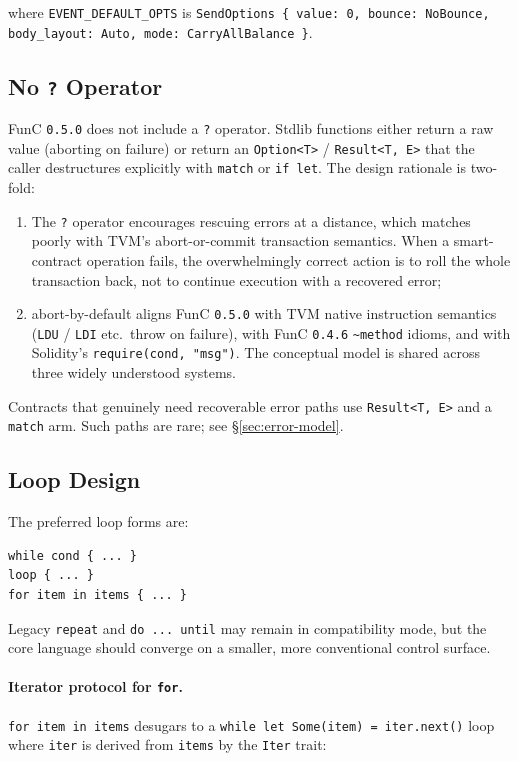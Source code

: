 \documentclass[12pt,oneside]{article}
\begin{document}
where \verb|EVENT_DEFAULT_OPTS| is \verb|SendOptions { value: 0, bounce: NoBounce, body_layout: Auto, mode: CarryAllBalance }|.

\subsection{No \texttt{?} Operator}
FunC \verb|0.5.0| does not include a \verb|?| operator. Stdlib
functions either return a raw value (aborting on failure) or return an
\verb|Option<T>| / \verb|Result<T, E>| that the caller destructures
explicitly with \verb|match| or \verb|if let|. The design rationale is
two-fold:

\begin{enumerate}
\item The \verb|?| operator encourages rescuing errors at a distance,
which matches poorly with TVM's abort-or-commit transaction
semantics. When a smart-contract operation fails, the
overwhelmingly correct action is to roll the whole transaction
back, not to continue execution with a recovered error;
\item abort-by-default aligns FunC \verb|0.5.0| with TVM native
instruction semantics (\verb|LDU| / \verb|LDI| etc.\ throw on
failure), with FunC \verb|0.4.6| \verb|~method| idioms, and with
Solidity's \verb|require(cond, "msg")|. The conceptual model is
shared across three widely understood systems.
\end{enumerate}

Contracts that genuinely need recoverable error paths use
\verb|Result<T, E>| and a \verb|match| arm. Such paths are rare; see
\S\ref{sec:error-model}.

\subsection{Loop Design}
The preferred loop forms are:

\begin{verbatim}
while cond { ... }
loop { ... }
for item in items { ... }
\end{verbatim}

Legacy \verb|repeat| and \verb|do ... until| may remain in compatibility mode,
but the core language should converge on a smaller, more conventional control
surface.

\paragraph{Iterator protocol for \texttt{for}.}
\verb|for item in items| desugars to a \verb|while let Some(item) = iter.next()|
loop where \verb|iter| is derived from \verb|items| by the \verb|Iter| trait:
\end{document}
